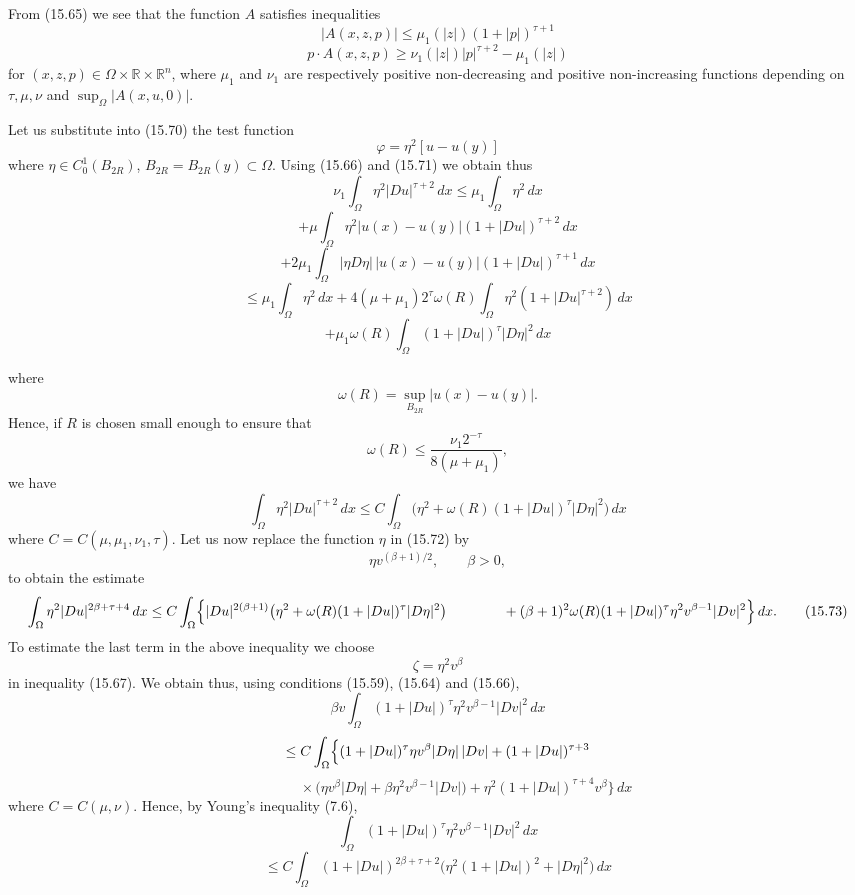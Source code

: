 From (15.65) we see that the function $A$ satisfies inequalities
\begin{equation}
|A(x,z,p)|\le \mu_1(|z|)(1+|p|)^{\tau+1}
\tag{15.71}
\end{equation}
\[
p\cdot A(x,z,p)\ge \nu_1(|z|)|p|^{\tau+2}-\mu_1(|z|)
\]
for $(x,z,p)\in \Omega\times \mathbb{R}\times \mathbb{R}^n$, where $\mu_1$ and $\nu_1$ are respectively positive non-decreasing and positive non-increasing functions depending on $\tau,\mu,\nu$ and $\sup_{\Omega}|A(x,u,0)|$.

Let us substitute into (15.70) the test function
\[
\varphi=\eta^2[u-u(y)]
\]
where $\eta\in C_0^1(B_{2R})$, $B_{2R}=B_{2R}(y)\subset\Omega$. Using (15.66) and (15.71) we obtain thus
\[
\nu_1\int_{\Omega}\eta^2|Du|^{\tau+2}\,dx\le \mu_1\int_{\Omega}\eta^2\,dx
\]
\[
+\mu\int_{\Omega}\eta^2|u(x)-u(y)|(1+|Du|)^{\tau+2}\,dx
\]
\[
+2\mu_1\int_{\Omega}|\eta D\eta|\,|u(x)-u(y)|(1+|Du|)^{\tau+1}\,dx
\]
\[
\le \mu_1\int_{\Omega}\eta^2\,dx+4(\mu+\mu_1)2^\tau\omega(R)\int_{\Omega}\eta^2(1+|Du|^{\tau+2})\,dx
\]
\[
+\mu_1\omega(R)\int_{\Omega}(1+|Du|)^{\tau}|D\eta|^2\,dx
\]

where
\[
\omega(R)=\sup_{B_{2R}} |u(x)-u(y)|.
\]
Hence, if $R$ is chosen small enough to ensure that
\[
\omega(R)\leq \frac{\nu_1 2^{-\tau}}{8(\mu+\mu_1)},
\]
we have
\[
\int_{\Omega} \eta^2 |Du|^{\tau+2}\,dx \leq C \int_{\Omega} \bigl(\eta^2+\omega(R)(1+|Du|)^{\tau}|D\eta|^2\bigr)\,dx
\tag{15.72}
\]
where $C=C(\mu,\mu_1,\nu_1,\tau)$. Let us now replace the function $\eta$ in (15.72) by
\[
\eta v^{(\beta+1)/2}, \qquad \beta>0,
\]
to obtain the estimate
\[
\int_{\Omega} \eta^2 |Du|^{2\beta+\tau+4}\,dx \leq C \int_{\Omega} \Bigl\{ |Du|^{2(\beta+1)}\bigl(\eta^2+\omega(R)(1+|Du|)^{\tau}|D\eta|^2\bigr)
\qquad\qquad +(\beta+1)^2\omega(R)(1+|Du|)^{\tau}\eta^2 v^{\beta-1}|Dv|^2 \Bigr\}\,dx.
\tag{15.73}
\]
To estimate the last term in the above inequality we choose
\[
\zeta=\eta^2 v^{\beta}
\]
in inequality (15.67). We obtain thus, using conditions (15.59), (15.64) and (15.66),
\[
\beta v \int_{\Omega} (1+|Du|)^{\tau}\eta^2 v^{\beta-1}|Dv|^2\,dx
\]
\[
\leq C \int_{\Omega} \Bigl\{(1+|Du|)^{\tau}\eta v^{\beta}|D\eta|\,|Dv|+(1+|Du|)^{\tau+3}
\]
\[
\qquad\qquad \times \bigl(\eta v^{\beta}|D\eta|+\beta\eta^2 v^{\beta-1}|Dv|\bigr)+\eta^2(1+|Du|)^{\tau+4}v^{\beta}\Bigr\}\,dx
\]
where $C=C(\mu,\nu)$. Hence, by Young's inequality (7.6),
\[
\int_{\Omega} (1+|Du|)^{\tau}\eta^2 v^{\beta-1}|Dv|^2\,dx
\]
\[
\leq C \int_{\Omega} (1+|Du|)^{2\beta+\tau+2}\bigl(\eta^2(1+|Du|)^2+|D\eta|^2\bigr)\,dx
\]

